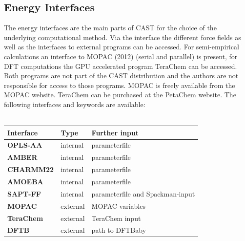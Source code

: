 \documentclass[10pt,a4paper]{article} %
\newif\ifverbose %
\begin{document}
	\subsection{Energy Interfaces}
	The energy interfaces are the main parts of \ac{CAST} for the choice of the underlying computational method. Via the interface the different force fields as well as the interfaces to external programs can be accessed. For semi-empirical calculations an interface to \ac{MOPAC} (2012) (serial\supercite{mopac} and parallel\supercite{mopac_parallel}) is present, for \ac{DFT} computations the \ac{GPU} accelerated program TeraChem\supercite{terachem} can be accessed. Both programs are not part of the \ac{CAST} distribution and the authors are not responsible for access to those programs. \ac{MOPAC}\supercite{mopac, mopac_parallel} is freely available from the \ac{MOPAC} website. TeraChem\supercite{terachem} can be purchased at the PetaChem website.
	The following interfaces and keywords are available:\\~\\
	\begin{tabularx}{\textwidth}{l|l|l}
		Interface & Type & Further input \\
		\hline
		\textbf{OPLS-AA} & internal & parameterfile \\
		\textbf{AMBER} & internal & parameterfile \\
		\textbf{CHARMM22} & internal & parameterfile \\
		\textbf{AMOEBA} & internal & parameterfile\\
		\textbf{SAPT-FF} & internal &parameterfile and Spackman-input\\
		\textbf{MOPAC} & external & MOPAC variables\\
		\textbf{TeraChem} & external & TeraChem input\\
		\textbf{DFTB} & external & path to DFTBaby\\
	\end{tabularx}	\\~\\
	\ifverbose
	In contrast to the force fields, the external interfaces do not need correct force field parameters. The coordinate file has to be in TINKER\supercite{tinker} format, however, it can be generated with arbitrary parameters.
	\fi
\end{document}
